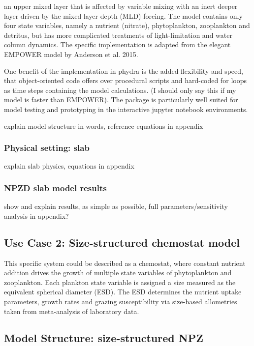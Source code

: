 \documentclass[journal abbreviation, manuscript]{copernicus}
\begin{document}
an upper mixed layer that is affected by variable mixing with an inert deeper layer driven by the mixed layer depth (MLD) forcing. The model contains only four state variables, namely a nutrient  (nitrate), phytoplankton, zooplankton and detritus, but has more complicated treatments of light-limitation and water column dynamics. The specific implementation is adapted from the elegant EMPOWER model by Anderson et al. 2015. 

One benefit of the implementation in phydra is the added flexibility and speed, that object-oriented code offers over procedural scripts and hard-coded for loops as time steps containing the model calculations. (I should only say this if my model is faster than EMPOWER). The package is particularly well suited for model testing and prototyping in the interactive jupyter notebook environments. 

explain model structure in words, reference equations in appendix

\subsubsection{Physical setting: slab}
explain slab physics, equations in appendix



\subsubsection{NPZD slab model results}
show and explain results, as simple as possible, full parameters/sensitivity analysis in appendix?


\subsection{Use Case 2: Size-structured chemostat model}

This specific system could be described as a chemostat, where constant nutrient addition drives the growth of multiple state variables of phytoplankton and zooplankton. Each plankton state variable is assigned a size measured as the equivalent spherical diameter (ESD). The ESD determines the nutrient uptake parameters, growth rates and grazing susceptibility via size-based allometries taken from meta-analysis of laboratory data.

\subsection{Model Structure: size-structured NPZ}
\end{document}
